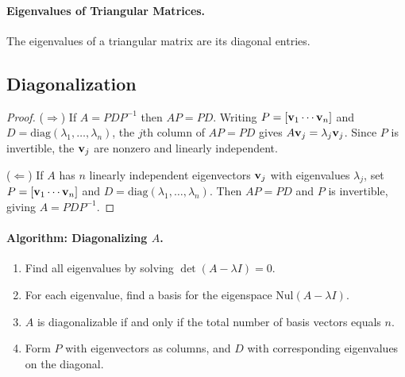 \documentclass[oneside]{book}
\begin{document}

\paragraph{Eigenvalues of Triangular Matrices.}
The eigenvalues of a triangular matrix are its diagonal entries.

\subsection{Diagonalization}



\begin{proof}
($\Rightarrow$) If $A = PDP^{-1}$ then $AP = PD$. Writing $P = [\mathbf{v}_1 \cdots \mathbf{v}_n]$ and $D = \mathrm{diag}(\lambda_1, \ldots, \lambda_n)$, the $j$th column of $AP = PD$ gives $A\mathbf{v}_j = \lambda_j\mathbf{v}_j$. Since $P$ is invertible, the $\mathbf{v}_j$ are nonzero and linearly independent.

\noindent($\Leftarrow$) If $A$ has $n$ linearly independent eigenvectors $\mathbf{v}_j$ with eigenvalues $\lambda_j$, set $P = [\mathbf{v}_1\cdots\mathbf{v}_n]$ and $D = \mathrm{diag}(\lambda_1,\ldots,\lambda_n)$. Then $AP = PD$ and $P$ is invertible, giving $A = PDP^{-1}$.
\end{proof}

\paragraph{Algorithm: Diagonalizing $A$.}
\begin{enumerate}
    \item Find all eigenvalues by solving $\det(A - \lambda I) = 0$.
    \item For each eigenvalue, find a basis for the eigenspace $\mathrm{Nul}(A - \lambda I)$.
    \item $A$ is diagonalizable if and only if the total number of basis vectors equals $n$.
    \item Form $P$ with eigenvectors as columns, and $D$ with corresponding eigenvalues on the diagonal.
\end{enumerate}
\end{document}
